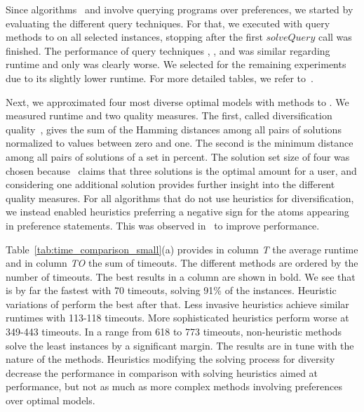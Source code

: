 Since algorithms~ and  involve querying programs over preferences, 
we started by evaluating the different query techniques. 
%
For that, we executed  with query methods  to  on all selected instances,
stopping after the first $\mathit{solveQuery}$ call was finished.
%
The performance of query techniques , , and  was similar regarding runtime and only  was clearly worse.
We selected  for the remaining experiments due to its slightly lower runtime. 
For more detailed tables, we refer to~\cite{roscwa16b}. %

Next, we approximated four most diverse optimal models with methods  to . 
%
We measured runtime and two quality measures.
The first, called diversification quality~\cite{nadel11a},
gives the sum of the Hamming distances among all pairs of solutions normalized to values between zero and one.
The second is the minimum distance among all pairs of solutions of a set in percent.
%
The solution set size of four was chosen because~\cite{shimazu01a} 
claims that three solutions is the optimal amount for a user,
and considering one additional solution provides further insight into the different quality measures. 
%
For all algorithms that do not use heuristics for diversification, 
we instead enabled heuristics preferring a negative sign for the atoms appearing in preference statements. 
This was observed in~\cite{brderosc15b} to improve performance.

Table~\ref{tab:time_comparison_small}(a) provides in column \textit{T} the average runtime and in column \textit{TO} the sum of timeouts. 
The different methods are ordered by the number of timeouts. 
The best results in a column are shown in bold. 
We see that  is by far the fastest with 70 timeouts, solving 91\% of the instances. 
Heuristic variations of  perform the best after that. 
Less invasive heuristics achieve similar runtimes with 113-118 timeouts.
More sophisticated heuristics perform worse at 349-443 timeouts.
In a range from 618 to 773 timeouts, non-heuristic methods solve the least instances by a significant margin.
The results are in tune with the nature of the methods. 
Heuristics modifying the solving process for diversity decrease the performance 
in comparison with solving heuristics aimed at performance, 
but not as much as more complex methods involving preferences over optimal models. 

